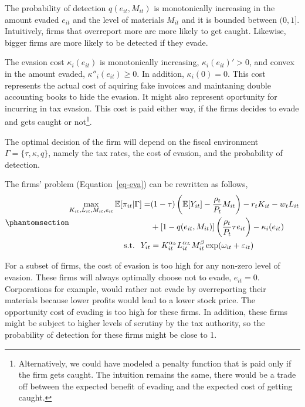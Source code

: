 \documentclass[
  12pt]{article}
\theoremstyle{definition}
\theoremstyle{remark}
\begin{document}
The probability of detection \(q(e_{it}, M_{it})\) is monotonically
increasing in the amount evaded \(e_{it}\) and the level of materials
\(M_{it}\) and it is bounded between \((0,1]\). Intuitively, firms that
overreport more are more likely to get caught. Likewise, bigger firms
are more likely to be detected if they evade.

The evasion cost \(\kappa_i(e_{it})\) is monotonically increasing,
\(\kappa_i(e_{it})'>0\), and convex in the amount evaded,
\(\kappa''_i(e_{it})\ge0\). In addition, \(\kappa_i(0)=0\). This cost
represents the actual cost of aquiring fake invoices and maintaning
double accounting books to hide the evasion. It might also represent
oportunity for incurring in tax evasion. This cost is paid either way,
if the firms decides to evade and gets caught or not\footnote{Alternatively,
  we could have modeled a penalty function that is paid only if the firm
  gets caught. The intuition remains the same, there would be a trade
  off between the expected benefit of evading and the expected cost of
  getting caught.}.

The optimal decision of the firm will depend on the fiscal environment
\(\Gamma=\{\tau, \kappa, q \}\), namely the tax rates, the cost of
evasion, and the probability of detection.

The firms' problem (Equation~\ref{eq-eva}) can be rewritten as follows,
\begin{equation}\phantomsection\label{eq-eva-2}{
\begin{aligned}
  \max_{K_{it}, L_{it},M_{it},e_{it}} \mathbb{E}[\pi_{it}|\Gamma] = &(1-\tau)\left(\mathbb{E}[Y_{it}]-\frac{\rho_{t}}{P_t} M_{it}\right)-r_tK_{it}-w_tL_{it}\\
  &+[1-q(e_{it}, M_{it})]\left(\frac{\rho_{t}}{P_t}\tau e_{it}\right)
  -\kappa_i(e_{it}) \\
  \text{s.t. }\; Y_{it}&=K_{it}^{\alpha_k}L_{it}^{\alpha_L}M_{it}^{\beta}\exp(\omega_{it}+\varepsilon_{it})
\end{aligned}
}\end{equation}

For a subset of firms, the cost of evasion is too high for any non-zero
level of evasion. These firms will always optimally choose not to evade,
\(e_{it}=0\). Corporations for example, would rather not evade by
overreporting their materials because lower profits would lead to a
lower stock price. The opportunity cost of evading is too high for these
firms. In addition, these firms might be subject to higher levels of
scrutiny by the tax authority, so the probability of detection for these
firms might be close to 1.
\end{document}
